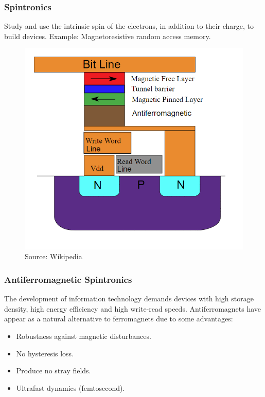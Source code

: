 \documentclass{beamer}
\begin{document}
\begin{frame}
\frametitle{Spintronics}
Study and use the intrinsic spin of the electrons, in addition to their charge, to build devices. Example: Magnetoresistive random access memory.


\begin{figure}
  \begin{minipage}[c]{0.6\textwidth}
    \includegraphics[width=\textwidth]{../Figures/fm_device.png}
  \end{minipage}\hfill
  \begin{minipage}[c]{0.2\textwidth}
    \caption{Source: Wikipedia} \label{fig:1}
  \end{minipage}
\end{figure}

\end{frame}


\begin{frame}
\frametitle{Antiferromagnetic Spintronics}
The development of information technology demands devices with high storage density, high energy efficiency and high write-read speeds. Antiferromagnets have appear as a natural alternative to ferromagnets due to some advantages: 
\begin{itemize}
\item Robustness against magnetic disturbances.
\item No hysteresis loss.
\item Produce no stray fields.
\item Ultrafast dynamics (femtosecond).
\end{itemize}
\end{frame}
\end{document}
